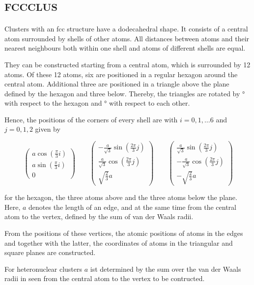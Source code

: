 \section{\textsc{fccclus}}

Clusters with an \ac{fcc} structure have a dodecahedral shape. It consists
of a central atom surrounded by shells of other atoms. All distances 
between atoms and their nearest neighbours both within one shell and atoms
of different shells are equal.

They can be constructed starting from a central atom, which is surrounded by
12 atoms. Of these 12 atoms, six are positioned in a regular hexagon around
the central atom. Additional three are positioned in a triangle above the
plane defined by the hexagon and three below. Thereby, the triangles are rotated
by \unit[30]{\degree} with respect to the hexagon and \unit[60]{\degree}
with respect to each other.

Hence, the positions of the corners of every shell are with $i=0,1,\dots 6$
and $j=0,1,2$ given by

\begin{equation}
 \begin{pmatrix}
  a \cos \left(\frac\pi3 i \right)\\
  a \sin \left(\frac\pi3 i \right)\\
  0
 \end{pmatrix}
 \quad\quad
 \begin{pmatrix}
  -\frac{a}{\sqrt{3}} \sin \left(\frac{2\pi}{3} j \right)\\
   \frac{a}{\sqrt{3}} \cos \left(\frac{2\pi}{3} j \right)\\
  \sqrt{\frac23} a
 \end{pmatrix}
 \quad\quad
 \begin{pmatrix}
   \frac{a}{\sqrt{3}} \sin \left(\frac{2\pi}{3} j \right)\\
  -\frac{a}{\sqrt{3}} \cos \left(\frac{2\pi}{3} j \right)\\
  -\sqrt{\frac23} a
 \end{pmatrix}
\end{equation}

for the hexagon, the three atoms above and the three atoms below the plane.
Here, $a$ denotes the length of an edge, and at the same time from the central
atom to the vertex, defined by the sum of van der Waals
radii.

From the positions of these vertices, the atomic positions of atoms in the
edges and together with the latter, the coordinates of atoms in the triangular
and square planes are constructed.

For heteronuclear clusters $a$ ist determined by the sum over the van der Waals
radii in seen from the central atom to the vertex to be contructed.
